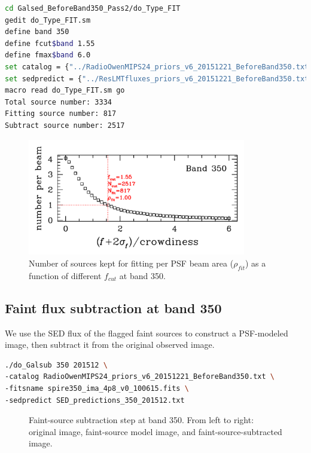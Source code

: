 \documentclass[11pt,a4paper]{article}
\begin{document}
\begin{lstlisting}[language=bash]
cd Galsed_BeforeBand350_Pass2/do_Type_FIT
gedit do_Type_FIT.sm
define band 350
define fcut$band 1.55
define fmax$band 6.0
set catalog = {"../RadioOwenMIPS24_priors_v6_20151221_BeforeBand350.txt"}
set sedpredict = {"../ResLMTfluxes_priors_v6_20151221_BeforeBand350.txt"}
macro read do_Type_FIT.sm go
Total source number: 3334
Fitting source number: 817
Subtract source number: 2517
\end{lstlisting}

\begin{figure}[H]
	\caption{Number of sources kept for fitting per PSF beam area ($\rho_{fit}$) as a function of different $f_{cut}$ at band 350.}
	\includegraphics[width=0.85\textwidth]{plot_cutting_flux_350_with_crow}
\end{figure}

\subsection{Faint flux subtraction at band 350}
\label{Band350_Galsub}

We use the SED flux of the flagged faint sources to construct a PSF-modeled image, then subtract it from the original observed image. 

\begin{lstlisting}[language=bash]
./do_Galsub 350 201512 \
-catalog RadioOwenMIPS24_priors_v6_20151221_BeforeBand350.txt \
-fitsname spire350_ima_4p8_v0_100615.fits \
-sedpredict SED_predictions_350_201512.txt
\end{lstlisting}

\begin{figure}[H]
	\caption{Faint-source subtraction step at band 350. From left to right: original image, faint-source model image, and faint-source-subtracted image.}
\end{figure}
\end{document}
